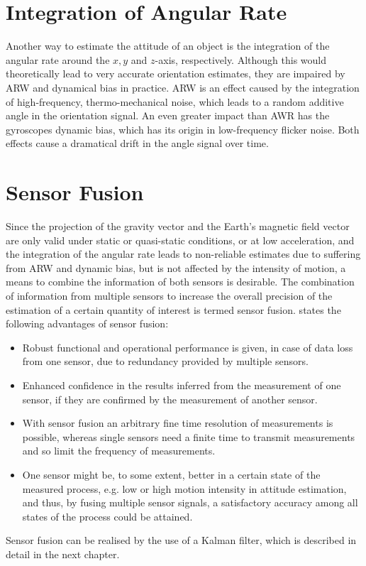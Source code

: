 \section{Integration of Angular Rate}

Another way to estimate the attitude of an object is the integration of the angular rate around the $x, y$ and $z$-axis, respectively. Although this would theoretically lead to very accurate orientation estimates, they are impaired by \gls{ARW} and dynamical bias in practice. \gls{ARW} is an effect caused by the integration of high-frequency, thermo-mechanical noise, which leads to a random additive angle in the orientation signal. An even greater impact than AWR has the gyroscopes dynamic bias, which has its origin in low-frequency flicker noise. Both effects cause a dramatical drift in the angle signal over time.

\section{Sensor Fusion}

Since the projection of the gravity vector and the Earth's magnetic field vector are only valid under static or quasi-static conditions, or at low acceleration, and the integration of the angular rate leads to non-reliable estimates due to suffering from \gls{ARW} and dynamic bias, but is not affected by the intensity of motion, a means to combine the information of both sensors is desirable. The combination of information from multiple sensors to increase the overall precision of the estimation of a certain quantity of interest is termed sensor fusion. \citeauthor{raol2009multi} \cite{raol2009multi} states the following advantages of sensor fusion:
 
\begin{itemize}
\item Robust functional and operational performance is given, in case of data loss from one sensor, due to redundancy provided by multiple sensors.
\item Enhanced confidence in the results inferred from the measurement of one sensor, if they are confirmed by the measurement of another sensor.
\item With sensor fusion an arbitrary fine time resolution of measurements is possible, whereas single sensors need a finite time to transmit measurements and so limit the frequency of measurements.
\item One sensor might be, to some extent, better in a certain state of the measured process, e.g. low or high motion intensity in attitude estimation, and thus, by fusing multiple sensor signals, a satisfactory accuracy among all states of the process could be attained.
\end{itemize}

\noindent
Sensor fusion can be realised by the use of a Kalman filter, which is described in detail in the next chapter.


